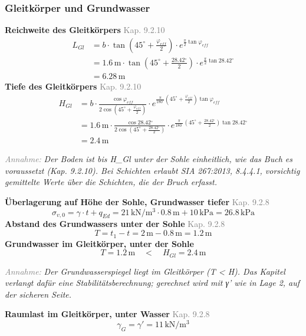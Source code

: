 \documentclass[11pt,a4paper]{article}
\newcommand{\normref}[1]{{\small\textcolor{gray}{#1}}}
\newcommand{\hinweis}[2]{\par\noindent\textcolor{gray}{\textit{#1:}} \textit{#2}\par}
\begin{document}
\subsubsection{Gleitkörper und Grundwasser}
\noindent\textbf{Reichweite des Gleitkörpers} \hfill \normref{Kap. 9.2.10}
\begin{equation*}
\begin{aligned}
  L_{Gl} &= b \cdot \tan\left(45^\circ + \frac{\varphi_{eff}}{2}\right) \cdot e^{\frac{\pi}{2} \tan \varphi_{eff}} \\
  &= 1.6\,\mathrm{m} \cdot \tan\left(45^\circ + \frac{28.42{}^{\circ}}{2}\right) \cdot e^{\frac{\pi}{2} \tan 28.42{}^{\circ}} \\
  &= 6.28\,\mathrm{m}
\end{aligned}
\end{equation*}
\noindent\textbf{Tiefe des Gleitkörpers} \hfill \normref{Kap. 9.2.10}
\begin{equation*}
\begin{aligned}
  H_{Gl} &= b \cdot \frac{\cos \varphi_{eff}}{2 \cos\left(45^\circ + \frac{\varphi_{eff}}{2}\right)} \cdot e^{\frac{\pi}{180^\circ}\left(45^\circ + \frac{\varphi_{eff}}{2}\right) \tan \varphi_{eff}} \\
  &= 1.6\,\mathrm{m} \cdot \frac{\cos 28.42{}^{\circ}}{2 \cos\left(45^\circ + \frac{28.42{}^{\circ}}{2}\right)} \cdot e^{\frac{\pi}{180^\circ}\left(45^\circ + \frac{28.42{}^{\circ}}{2}\right) \tan 28.42{}^{\circ}} \\
  &= 2.4\,\mathrm{m}
\end{aligned}
\end{equation*}
\hinweis{Annahme}{Der Boden ist bis H\_Gl unter der Sohle einheitlich, wie das Buch es voraussetzt (Kap. 9.2.10). Bei Schichten erlaubt SIA 267:2013, 8.4.4.1, vorsichtig gemittelte Werte über die Schichten, die der Bruch erfasst.}
\noindent\textbf{Überlagerung auf Höhe der Sohle, Grundwasser tiefer} \hfill \normref{Kap. 9.2.8}
\begin{equation*}
\sigma_{v,0} = \gamma \cdot t + q_{Ed} = 21\,\mathrm{kN}/\mathrm{m}^{3} \cdot 0.8\,\mathrm{m} + 10\,\mathrm{kPa} = 26.8\,\mathrm{kPa}
\end{equation*}
\noindent\textbf{Abstand des Grundwassers unter der Sohle} \hfill \normref{Kap. 9.2.8}
\begin{equation*}
T = t_1 - t = 2\,\mathrm{m} - 0.8\,\mathrm{m} = 1.2\,\mathrm{m}
\end{equation*}
\noindent\textbf{Grundwasser im Gleitkörper, unter der Sohle}
\begin{equation*}
T = 1.2\,\mathrm{m} \quad < \quad H_{Gl} = 2.4\,\mathrm{m}
\end{equation*}
\hinweis{Annahme}{Der Grundwasserspiegel liegt im Gleitkörper (T < H). Das Kapitel verlangt dafür eine Stabilitätsberechnung; gerechnet wird mit γ' wie in Lage 2, auf der sicheren Seite.}
\noindent\textbf{Raumlast im Gleitkörper, unter Wasser} \hfill \normref{Kap. 9.2.8}
\begin{equation*}
\gamma_G = \gamma' = 11\,\mathrm{kN}/\mathrm{m}^{3}
\end{equation*}
\end{document}
